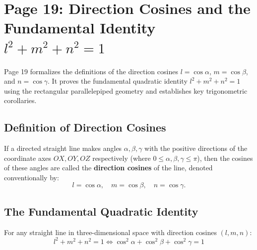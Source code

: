 \section{Page 19: Direction Cosines and the Fundamental Identity $l^2+m^2+n^2=1$}
\label{sec:page19}

\begin{conceptbox}
Page 19 formalizes the definitions of the direction cosines $l = \cos\alpha$, $m = \cos\beta$, and $n = \cos\gamma$. It proves the fundamental quadratic identity $l^2 + m^2 + n^2 = 1$ using the rectangular parallelepiped geometry and establishes key trigonometric corollaries.
\end{conceptbox}

\subsection{Definition of Direction Cosines}
\begin{conceptbox}
If a directed straight line makes angles $\alpha, \beta, \gamma$ with the positive directions of the coordinate axes $OX, OY, OZ$ respectively (where $0 \le \alpha, \beta, \gamma \le \pi$), then the cosines of these angles are called the \textbf{direction cosines} of the line, denoted conventionally by:
\begin{equation}
    l = \cos\alpha, \quad m = \cos\beta, \quad n = \cos\gamma.
\end{equation}
\end{conceptbox}

\subsection{The Fundamental Quadratic Identity}
\begin{theorembox}
For any straight line in three-dimensional space with direction cosines $(l, m, n)$:
\begin{equation}
    \boxed{l^2 + m^2 + n^2 = 1 \iff \cos^2\alpha + \cos^2\beta + \cos^2\gamma = 1}
\end{equation}
\end{theorembox}

